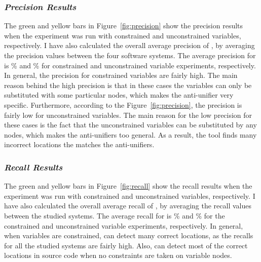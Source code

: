 \subsubsection{\emph{Precision Results}}  \label{precision-results}
The green and yellow bars in Figure~\ref{fig:precision}  show the precision results when the experiment was run with constrained and unconstrained variables, respectively. I have also calculated the overall average precision of , by averaging the precision values between the four software systems. The average precision for  is \% and \% for constrained and unconstrained variable experiments, respectively. In general, the precision for constrained variables are fairly high. The main reason behind the high precision is that in these cases the variables can only be substituted with some particular nodes, which makes the anti-unifier very specific. Furthermore, according to the Figure~\ref{fig:precision}, the precision is fairly low for unconstrained variables. The main reason for the low precision for these cases is the fact that the unconstrained variables can be substituted by any nodes, which makes the anti-unifiers too general. As a result, the tool finds many incorrect locations the matches the anti-unifiers.

\subsubsection{\emph{Recall Results}}  \label{recall-results}
The green and yellow bars in Figure~\ref{fig:recall}  show the recall results when the experiment was run with constrained and unconstrained variables, respectively. I have also calculated the overall average recall of , by averaging the recall values between the studied systems. The average recall for  is \% and \% for the constrained and unconstrained variable experiments, respectively. In general, when variables are constrained,  can detect many correct locations, as the recalls for all the studied systems are fairly high. Also,  can detect most of the correct locations in source code when no constraints are taken on variable nodes.

